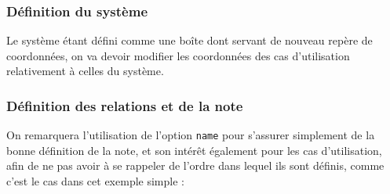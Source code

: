 \documentclass[a4paper,11pt]{report}
\newcommand{\inputTikZ}[1]{%
  }%
\newcommand{\inputTikZ}[1]{%
    \texttt{[image: fig/\#1.pdf]}%
  }%
\begin{document}
{\color{red!70!black}
\vspace{-0.4cm}
}


\begin{center}
\inputTikZ{usecasediagstep2}
\end{center}

\subsubsection{Définition du système}

Le système étant défini comme une boîte dont servant de nouveau repère de coordonnées, on va devoir modifier les coordonnées des cas d'utilisation relativement à celles du système.

{\color{red!70!black}
\vspace{-0.4cm}
}
\vspace{-0.4cm}
{\color{red!70!black}
\vspace{-0.4cm}
}


\begin{center}
\inputTikZ{usecasediagstep3}
\end{center}

\subsubsection{Définition des relations et de la note}

On remarquera l'utilisation de l'option {\tt name} pour s'assurer simplement de la bonne définition de la note, et son intérêt également pour les cas d'utilisation, afin de ne pas avoir à se rappeler de l'ordre dans lequel ils sont définis, comme c'est le cas dans cet exemple simple :

\vspace{-0.4cm}
{\color{red!70!black}

}

\begin{center}
\inputTikZ{usecasediagstep4}
\end{center}

\end{document}

